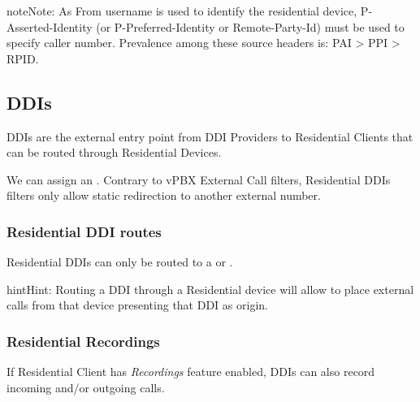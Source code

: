 \documentclass[letterpaper,10pt,english]{sphinxmanual}
\begin{document}
\begin{notice}{note}{Note:}
As From username is used to identify the residential device, P-Asserted-Identity (or P-Preferred-Identity or Remote-Party-Id) must be used to specify caller number.
Prevalence among these source headers is: PAI \textgreater{} PPI \textgreater{} RPID.
\end{notice}


\subsection{DDIs}
\label{administration_portal/client/residential/ddis:ddis}\label{administration_portal/client/residential/ddis:residential-ddis}\label{administration_portal/client/residential/ddis::doc}
DDIs are the external entry point from DDI Providers to Residential Clients that
can be routed through Residential Devices.

We can assign an {\hyperref[administration_portal/client/vpbx/routing_tools/external_call_filters:external\string-call\string-filters]{}}. Contrary to vPBX External Call filters, Residential DDIs
filters only allow static redirection to another external number.


\subsubsection{Residential DDI routes}
\label{administration_portal/client/residential/ddis:residential-ddi-routes}
Residential DDIs can only be routed to a {\hyperref[administration_portal/client/residential/residential_devices:residential\string-devices]{}}
or {\hyperref[administration_portal/client/vpbx/faxes:faxing\string-system]{}}.

\begin{notice}{hint}{Hint:}
Routing a DDI through a Residential device will allow to place external calls
from that device presenting that DDI as origin.
\end{notice}


\subsubsection{Residential Recordings}
\label{administration_portal/client/residential/ddis:residential-recordings}
If Residential Client has \emph{Recordings} feature enabled, DDIs can also record incoming and/or
outgoing calls.
\end{document}
